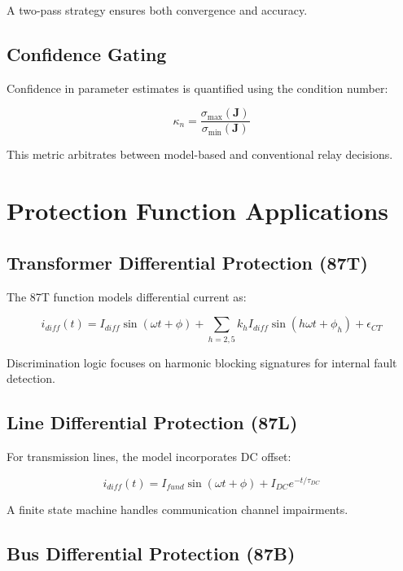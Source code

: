 \documentclass[10pt]{article}
\begin{document}
A two-pass strategy ensures both convergence and accuracy.

\subsection{Confidence Gating}

Confidence in parameter estimates is quantified using the condition number:

\begin{equation}
\kappa_n = \frac{\sigma_{\max}(\mathbf{J})}{\sigma_{\min}(\mathbf{J})}
\label{eq:condition}
\end{equation}

This metric arbitrates between model-based and conventional relay decisions.

\section{Protection Function Applications}
\label{sec:applications}

\subsection{Transformer Differential Protection (87T)}

The 87T function models differential current as:

\begin{equation}
i_{diff}(t) = I_{diff} \sin(\omega t + \phi) + \sum_{h=2,5} k_h I_{diff} \sin(h\omega t + \phi_h) + \epsilon_{CT}
\label{eq:87t}
\end{equation}

Discrimination logic focuses on harmonic blocking signatures for internal fault detection.

\subsection{Line Differential Protection (87L)}

For transmission lines, the model incorporates DC offset:

\begin{equation}
i_{diff}(t) = I_{fund} \sin(\omega t + \phi) + I_{DC} e^{-t/\tau_{DC}}
\label{eq:87l}
\end{equation}

A finite state machine handles communication channel impairments.

\subsection{Bus Differential Protection (87B)}
\end{document}
